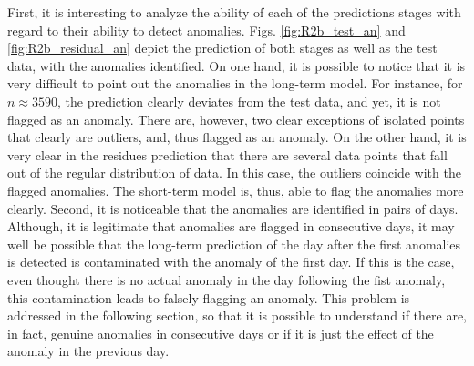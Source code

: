 \documentclass[a4paper, oneside, 11pt]{article}
\begin{document}
First, it is interesting to analyze the ability of each of the predictions stages with regard to their ability to detect anomalies. Figs. \ref{fig:R2b_test_an} and \ref{fig:R2b_residual_an} depict the prediction of both stages as well as the test data, with the anomalies identified. On one hand, it is possible to notice that it is very difficult to point out the anomalies in the long-term model. For instance, for $n \approx 3590$, the prediction clearly deviates from the test data, and yet, it is not flagged as an anomaly. There are, however, two clear exceptions of isolated points that clearly are outliers, and, thus flagged as an anomaly. On the other hand, it is very clear in the residues prediction that there are several data points that fall out of the regular distribution of data. In this case, the outliers coincide with the flagged anomalies. The short-term model is, thus, able to flag the anomalies more clearly. Second, it is noticeable that the anomalies are identified in pairs of days. Although, it is legitimate that anomalies are flagged in consecutive days, it may well be possible that the long-term prediction of the day after the first anomalies is detected is contaminated with the anomaly of the first day. If this is the case, even thought there is no actual anomaly in the day following the fist anomaly, this contamination leads to falsely flagging an anomaly. This problem is addressed in the following section, so that it is possible to understand if there are, in fact, genuine anomalies in consecutive days or if it is just the effect of the anomaly in the previous day.
\end{document}
